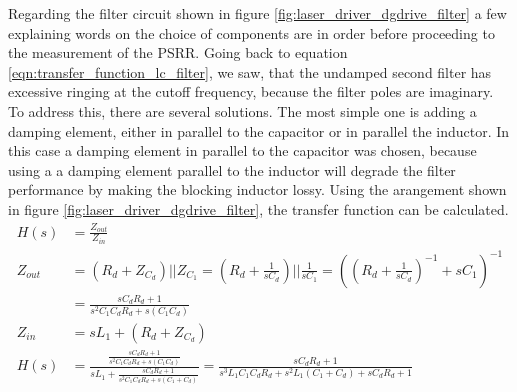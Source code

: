 Regarding the filter circuit shown in figure \ref{fig:laser_driver_dgdrive_filter} a few explaining words on the choice of components are in order before proceeding to the measurement of the PSRR. Going back to equation \ref{eqn:transfer_function_lc_filter}, we saw, that the undamped second filter has excessive ringing at the cutoff frequency, because the filter poles are imaginary. To address this, there are several solutions. The most simple one is adding a damping element, either in parallel to the capacitor or in parallel the inductor. In this case a damping element in parallel to the capacitor was chosen, because using a a damping element parallel to the inductor will degrade the filter performance by making the blocking inductor lossy. Using the arangement shown in figure \ref{fig:laser_driver_dgdrive_filter}, the transfer function can be calculated.
\begin{align}
    H(s) &= \frac{Z_{out}}{Z_{in}} \nonumber\\
    Z_{out} &= \left(R_d + Z_{C_d}\right) || Z_{C_1} = \left(R_d + \frac{1}{s C_d}\right) || \frac{1}{s C_1} = \left(\left(R_d + \frac{1}{sC_d}\right)^{-1} + sC_1\right)^{-1} \nonumber\\
    &= \frac{s C_d R_d +1}{s^2 C_1 C_d R_d + s \left(C_1 C_d\right)}\\
    Z_{in} &= sL_1 + \left(R_d + Z_{C_d}\right) \nonumber\\
    H(s) &= \frac{\frac{s C_d R_d +1}{s^2 C_1 C_d R_d + s \left(C_1 C_d\right)}}{s L_1  + \frac{s C_d R_d +1}{s^2 C_1 C_d R_d + s \left(C_1 + C_d\right)}} = \frac{s C_d R_d +1}{s^3 L_1 C_1 C_d R_d + s^2 L_1 \left(C_1 + C_d\right) + s C_d R_d +1 }
\end{align}

